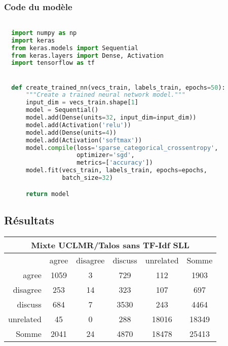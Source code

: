 \documentclass[onecolumn, 12pt]{article}
\begin{document}
\subsubsection{Code du modèle}
\begin{lstlisting}[language=Python]

  import numpy as np
  import keras
  from keras.models import Sequential
  from keras.layers import Dense, Activation
  import tensorflow as tf


  def create_trained_nn(vecs_train, labels_train, epochs=50):
      """Create a trained neural network model."""
      input_dim = vecs_train.shape[1]
      model = Sequential()
      model.add(Dense(units=32, input_dim=input_dim))
      model.add(Activation('relu'))
      model.add(Dense(units=4))
      model.add(Activation('softmax'))
      model.compile(loss='sparse_categorical_crossentropy',
                    optimizer='sgd',
                    metrics=['accuracy'])
      model.fit(vecs_train, labels_train, epochs=epochs,
                batch_size=32)

      return model
\end{lstlisting}



\subsection{Résultats}
\begin{center}
 \begin{tabular}{ r | c c c c | c }
  \multicolumn{6}{c}{Mixte UCLMR/Talos sans TF-Idf SLL}      \\
  \hline
            & agree & disagree & discuss & unrelated & Somme \\
  \hline
  agree     & 1059  & 3        & 729     & 112       & 1903  \\
  disagree  & 253   & 14       & 323     & 107       & 697   \\
  discuss   & 684   & 7        & 3530    & 243       & 4464  \\
  unrelated & 45    & 0        & 288     & 18016     & 18349 \\
  \hline
  Somme     & 2041  & 24       & 4870    & 18478     & 25413 \\
 \end{tabular}
\end{center}
\end{document}
